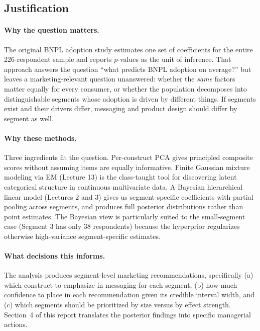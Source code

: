\documentclass[11pt]{article}
\begin{document}
\subsection{Justification}

\paragraph{Why the question matters.} The original BNPL adoption study
\citep{dadra2024tep} estimates one set of coefficients for the entire
226-respondent sample and reports $p$-values as the unit of inference.
That approach answers the question ``what predicts BNPL adoption on
average?'' but leaves a marketing-relevant question unanswered: whether
the \emph{same} factors matter equally for every consumer, or whether
the population decomposes into distinguishable segments whose adoption
is driven by different things. If segments exist and their drivers
differ, messaging and product design should differ by segment as well.

\paragraph{Why these methods.} Three ingredients fit the question.
Per-construct PCA gives principled composite scores without assuming
items are equally informative. Finite Gaussian mixture modeling via EM
(Lecture 13) is the class-taught tool for discovering latent categorical
structure in continuous multivariate data. A Bayesian hierarchical
linear model (Lectures 2 and 3) gives us segment-specific coefficients
with partial pooling across segments, and produces full posterior
distributions rather than point estimates. The Bayesian view is
particularly suited to the small-segment case (Segment 3 has only 38
respondents) because the hyperprior regularizes otherwise high-variance
segment-specific estimates.

\paragraph{What decisions this informs.} The analysis produces
segment-level marketing recommendations, specifically (a) which
construct to emphasize in messaging for each segment, (b) how much
confidence to place in each recommendation given its credible interval
width, and (c) which segments should be prioritized by size versus by
effect strength. Section~4 of this report translates the posterior
findings into specific managerial actions.
\end{document}

